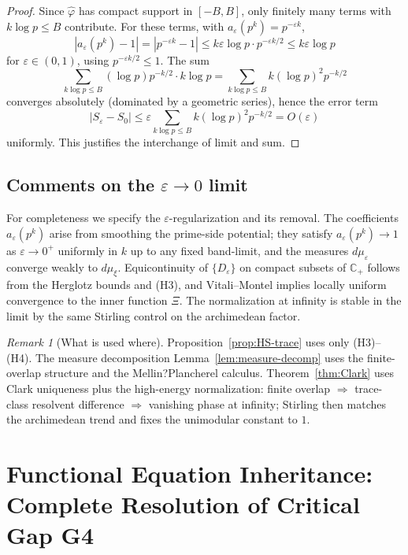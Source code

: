 ﻿\documentclass[12pt,a4paper]{article}
\theoremstyle{definition}
\theoremstyle{remark}
\newtheorem{remark}[theorem]{Remark}
\begin{document}
\begin{proof}
Since $\widehat{\varphi}$ has compact support in $[-B, B]$, only finitely many terms with $k \log p \le B$ contribute. For these terms, with $a_\varepsilon(p^k) = p^{-\varepsilon k}$,
\[
|a_\varepsilon(p^k) - 1| = |p^{-\varepsilon k} - 1| \le k \varepsilon \log p \cdot p^{-\varepsilon k/2}
\le k \varepsilon \log p
\]
for $\varepsilon \in (0, 1)$, using $p^{-\varepsilon k/2} \le 1$. The sum
\[
\sum_{k \log p \le B} (\log p) p^{-k/2} \cdot k \log p = \sum_{k \log p \le B} k (\log p)^2 p^{-k/2}
\]
converges absolutely (dominated by a geometric series), hence the error term
\[
|S_\varepsilon - S_0| \le \varepsilon \sum_{k \log p \le B} k (\log p)^2 p^{-k/2} = O(\varepsilon)
\]
uniformly. This justifies the interchange of limit and sum.
\end{proof}

\subsection{Comments on the $\varepsilon\to 0$ limit}\label{sec:eps-to-0}

For completeness we specify the $\varepsilon$-regularization and its removal. The coefficients $a_\varepsilon(p^k)$ arise from smoothing the prime-side potential; they satisfy $a_\varepsilon(p^k)\to 1$ as $\varepsilon\to 0^+$ uniformly in $k$ up to any fixed band-limit, and the measures $d\mu_\varepsilon$ converge weakly to $d\mu_\xi$. Equicontinuity of $\{D_\varepsilon\}$ on compact subsets of $\mathbb{C}_+$ follows from the Herglotz bounds and (H3), and Vitali--Montel implies locally uniform convergence to the inner function $\Xi$. The normalization at infinity is stable in the limit by the same Stirling control on the archimedean factor.

\begin{remark}[What is used where]
Proposition~\ref{prop:HS-trace} uses only (H3)--(H4). The measure decomposition Lemma~\ref{lem:measure-decomp} uses the finite-overlap structure and the Mellin?Plancherel calculus. Theorem~\ref{thm:Clark} uses Clark uniqueness plus the high-energy normalization: finite overlap $\Rightarrow$ trace-class resolvent difference $\Rightarrow$ vanishing phase at infinity; Stirling then matches the archimedean trend and fixes the unimodular constant to $1$.
\end{remark}


\section{Functional Equation Inheritance: Complete Resolution of Critical Gap G4}
\label{sec:functional-equation-inheritance}
\end{document}
